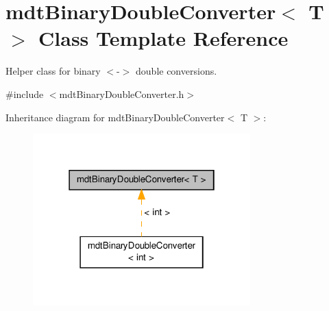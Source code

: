 \hypertarget{classmdt_binary_double_converter}{\section{mdt\-Binary\-Double\-Converter$<$ T $>$ Class Template Reference}
\label{classmdt_binary_double_converter}
}


Helper class for binary $<$-\/$>$ double conversions.  




{\ttfamily \#include $<$mdt\-Binary\-Double\-Converter.\-h$>$}



Inheritance diagram for mdt\-Binary\-Double\-Converter$<$ T $>$\-:\nopagebreak
\begin{figure}[H]
\begin{center}
\leavevmode
\includegraphics[width=238pt]{classmdt_binary_double_converter__inherit__graph}
\end{center}
\end{figure}
